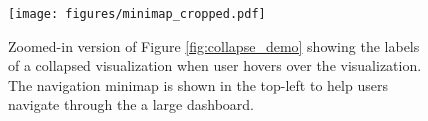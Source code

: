 \begin{figure}[ht!]
\centering
\texttt{[image: figures/minimap\_cropped.pdf]}
\caption{Zoomed-in version of Figure \ref{fig:collapse_demo} showing the labels of a collapsed visualization when user hovers over the visualization. The navigation minimap is shown in the top-left to help users navigate through the a large dashboard.}
\label{fig:hover_minimap}
\end{figure}
